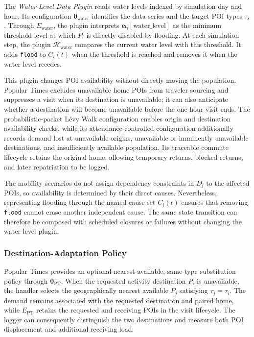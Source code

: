 The \textit{Water-Level Data Plugin} reads water levels indexed by simulation day and hour. Its configuration $\bm{\theta}_{\mathrm{water}}$ identifies the data series and the target POI types $\tau_i$. Through $E_{\mathrm{water}}$, the plugin interprets $\bm{\alpha}_i[\mathrm{water\_level}]$ as the minimum threshold level at which $P_i$ is directly disabled by flooding. At each simulation step, the plugin $\mathcal{H}_{\mathrm{water}}$ compares the current water level with this threshold. It adds \texttt{flood} to $C_i(t)$ when the threshold is reached and removes it when the water level recedes.

This plugin changes POI availability without directly moving the population. Popular Times excludes unavailable home POIs from traveler sourcing and suppresses a visit when its destination is unavailable; it can also anticipate whether a destination will become unavailable before the one-hour visit ends. The probabilistic-packet L\'evy Walk configuration enables origin and destination availability checks, while its attendance-controlled configuration additionally records demand lost at unavailable origins, unavailable or imminently unavailable destinations, and insufficiently available population. Its traceable commute lifecycle retains the original home, allowing temporary returns, blocked returns, and later repatriation to be logged.

The mobility scenarios do not assign dependency constraints in $D_i$ to the affected POIs, so availability is determined by their direct causes. Nevertheless, representing flooding through the named cause set $C_i(t)$ ensures that removing \texttt{flood} cannot erase another independent cause. The same state transition can therefore be composed with scheduled closures or failures without changing the water-level plugin.

\subsubsection{Destination-Adaptation Policy}

Popular Times provides an optional nearest-available, same-type substitution policy through $\bm{\theta}_{\mathrm{PT}}$. When the requested activity destination $P_i$ is unavailable, the handler selects the geographically nearest available $P_j$ satisfying $\tau_j=\tau_i$. The demand remains associated with the requested destination and paired home, while $E_{\mathrm{PT}}$ retains the requested and receiving POIs in the visit lifecycle. The logger can consequently distinguish the two destinations and measure both POI displacement and additional receiving load.

